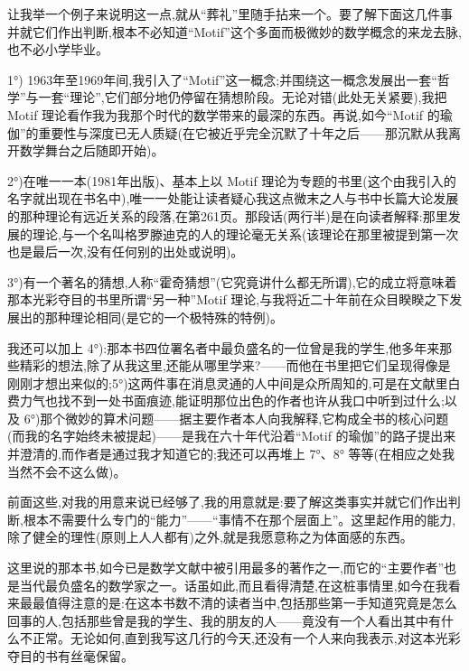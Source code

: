 让我举一个例子来说明这一点,就从“葬礼”里随手拈来一个。要了解下面这几件事并就它们作出判断,根本不必知道“Motif”这个多面而极微妙的数学概念的来龙去脉,也不必小学毕业。

1°) 1963年至1969年间,我引入了“Motif”这一概念;并围绕这一概念发展出一套“哲学”与一套“理论”,它们部分地仍停留在猜想阶段。无论对错(此处无关紧要),我把 Motif 理论看作我为我那个时代的数学带来的最深的东西。再说,如今“Motif 的瑜伽”的重要性与深度已无人质疑(在它被近乎完全沉默了十年之后——那沉默从我离开数学舞台之后随即开始)。

2°)在唯一一本(1981年出版)、基本上以 Motif 理论为专题的书里(这个由我引入的名字就出现在书名中),唯一一处能让读者疑心我这点微末之人与书中长篇大论发展的那种理论有远近关系的段落,在第261页。那段话(两行半)是在向读者解释:那里发展的理论,与一个名叫格罗滕迪克的人的理论毫无关系(该理论在那里被提到第一次也是最后一次,没有任何别的出处或说明)。

3°)有一个著名的猜想,人称“霍奇猜想”(它究竟讲什么都无所谓),它的成立将意味着那本光彩夺目的书里所谓“另一种”Motif 理论,与我将近二十年前在众目睽睽之下发展出的那种理论相同(是它的一个极特殊的特例)。

我还可以加上 4°):那本书四位署名者中最负盛名的一位曾是我的学生,他多年来那些精彩的想法,除了从我这里,还能从哪里学来?——而他在书里把它们呈现得像是刚刚才想出来似的;5°)这两件事在消息灵通的人中间是众所周知的,可是在文献里白费力气也找不到一处书面痕迹,能证明那位出色的作者也许从我口中听到过什么;以及 6°)那个微妙的算术问题——据主要作者本人向我解释,它构成全书的核心问题(而我的名字始终未被提起)——是我在六十年代沿着“Motif 的瑜伽”的路子提出来并澄清的,而作者是通过我才知道它的;我还可以再堆上 7°、8° 等等(在相应之处我当然不会不这么做)。

前面这些,对我的用意来说已经够了,我的用意就是:要了解这类事实并就它们作出判断,根本不需要什么专门的“能力”——“事情不在那个层面上”。这里起作用的能力,除了健全的理性(原则上人人都有)之外,就是我愿意称之为体面感的东西。

这里说的那本书,如今已是数学文献中被引用最多的著作之一,而它的“主要作者”也是当代最负盛名的数学家之一。话虽如此,而且看得清楚,在这桩事情里,如今在我看来最最值得注意的是:在这本书数不清的读者当中,包括那些第一手知道究竟是怎么回事的人,包括那些曾是我的学生、我的朋友的人——竟没有一个人看出其中有什么不正常。无论如何,直到我写这几行的今天,还没有一个人来向我表示,对这本光彩夺目的书有丝毫保留。

